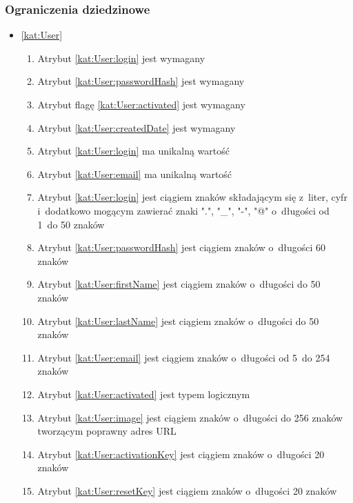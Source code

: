 \subsubsection{Ograniczenia dziedzinowe}\label{subsubsec:database:gateway:restrictions}

\begin{itemize}[label={\textbf{Ograniczenia dla}}, wide, labelwidth=!, labelindent=0pt]
    \setlength\itemsep{1.75em}
    \item\ref{kat:User}\mynobreakpar
    \begin{enumerate}[label={\textbf{OGR/1/\protect\twodigits{\arabic{enumi}}}}, wide, labelwidth=!, align=left, leftmargin=3cm]
        \item Atrybut \ref{kat:User:login} jest wymagany
        \item Atrybut \ref{kat:User:passwordHash} jest wymagany
        \item Atrybut flagę \ref{kat:User:activated} jest wymagany
        \item Atrybut \ref{kat:User:createdDate} jest wymagany
        \item Atrybut \ref{kat:User:login} ma unikalną wartość
        \item Atrybut \ref{kat:User:email} ma unikalną wartość
        \item Atrybut \ref{kat:User:login} jest ciągiem znaków składającym się z~liter, cyfr i~dodatkowo mogącym zawierać znaki ".", "\_", "-", "@" o~długości od 1~do 50 znaków
        \item Atrybut \ref{kat:User:passwordHash} jest ciągiem znaków o~długości 60 znaków
        \item Atrybut \ref{kat:User:firstName} jest ciągiem znaków o~długości do 50 znaków
        \item Atrybut \ref{kat:User:lastName} jest ciągiem znaków o~długości do 50 znaków
        \item Atrybut \ref{kat:User:email} jest ciągiem znaków o~długości od 5~do 254 znaków
        \item Atrybut \ref{kat:User:activated} jest typem logicznym
        \item Atrybut \ref{kat:User:image} jest ciągiem znaków o~długości do 256 znaków tworzącym poprawny adres URL
        \item Atrybut \ref{kat:User:activationKey} jest ciągiem znaków o~długości 20 znaków
        \item Atrybut \ref{kat:User:resetKey} jest ciągiem znaków o~długości 20 znaków

\end{enumerate}
\end{itemize}
